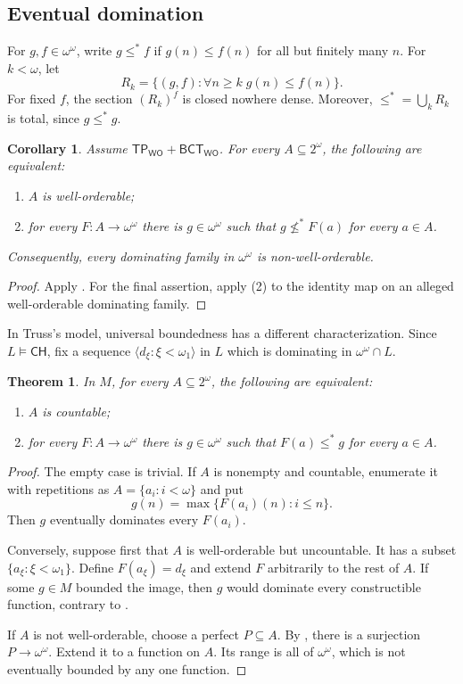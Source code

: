 \documentclass[11pt,reqno]{amsart}
\newcommand{\WO}{\mathsf{WO}}
\newcommand{\BCTWO}{\mathsf{BCT}_{\WO}}
\newcommand{\TP}{\mathsf{TP}_{\WO}}
\theoremstyle{plain}
\newtheorem{theorem}{Theorem}[section]
\newtheorem{corollary}[corollary]{Corollary}
\theoremstyle{definition}
\theoremstyle{remark}
\begin{document}
\subsection{Eventual domination}

For $g,f\in\omega^\omega$, write $g\leq^*f$ if
$g(n)\leq f(n)$ for all but finitely many $n$.  For $k<\omega$, let
\[
 R_k=\{(g,f):\forall n\geq k\;g(n)\leq f(n)\}.
\]
For fixed $f$, the section $(R_k)^f$ is closed nowhere dense.  Moreover,
$\leq^*=\bigcup_kR_k$ is total, since $g\leq^*g$.

\begin{corollary}\label{cor:nondomination}
Assume $\TP+\BCTWO$.  For every $A\subseteq2^\omega$, the following are
equivalent:
\begin{enumerate}
\item $A$ is well-orderable;
\item for every $F:A\to\omega^\omega$ there is $g\in\omega^\omega$ such
that $g\not\leq^*F(a)$ for every $a\in A$.
\end{enumerate}
Consequently, every dominating family in $\omega^\omega$ is
non-well-orderable.
\end{corollary}

\begin{proof}
Apply .  For the final assertion, apply (2) to
the identity map on an alleged well-orderable dominating family.
\end{proof}

In Truss's model, universal boundedness has a different characterization.
Since $L\models\mathsf{CH}$, fix a sequence
$\langle d_\xi:\xi<\omega_1\rangle$ in $L$ which is dominating in
$\omega^\omega\cap L$.

\begin{theorem}\label{thm:boundedness-threshold}
In $M$, for every $A\subseteq2^\omega$, the following are equivalent:
\begin{enumerate}
\item $A$ is countable;
\item for every $F:A\to\omega^\omega$ there is $g\in\omega^\omega$ such
that $F(a)\leq^*g$ for every $a\in A$.
\end{enumerate}
\end{theorem}

\begin{proof}
The empty case is trivial.  If $A$ is nonempty and countable, enumerate it
with repetitions as $A=\{a_i:i<\omega\}$ and put
\[
 g(n)=\max\{F(a_i)(n):i\leq n\}.
\]
Then $g$ eventually dominates every $F(a_i)$.

Conversely, suppose first that $A$ is well-orderable but uncountable.  It has
a subset $\{a_\xi:\xi<\omega_1\}$.  Define
$F(a_\xi)=d_\xi$ and extend $F$ arbitrarily to the rest of $A$.  If some
$g\in M$ bounded the image, then $g$ would dominate every constructible
function, contrary to .

If $A$ is not well-orderable, choose a perfect $P\subseteq A$.  By
, there is a surjection $P\to\omega^\omega$.
Extend it to a function on $A$.  Its range is all of $\omega^\omega$, which
is not eventually bounded by any one function.
\end{proof}
\end{document}
